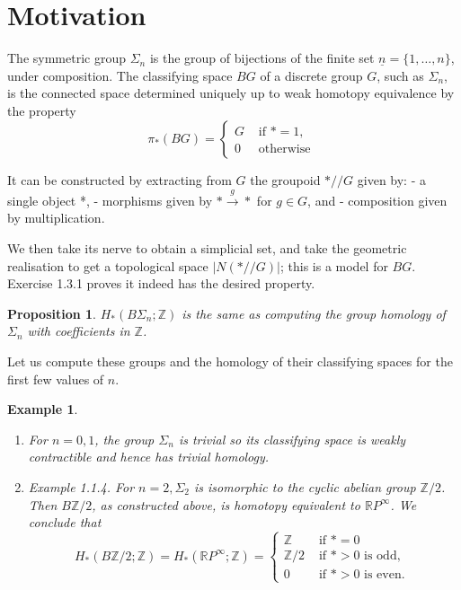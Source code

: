 \documentclass{book}
\newtheorem{prop}{Proposition}
\newtheorem{example}{Example}
\begin{document}
\section{Motivation}

The symmetric group $\Sigma_n$ is the group of bijections of the finite set $\underline{n}=\{1, \ldots, n\}$, under composition. The classifying space $B G$ of a discrete group $G$, such as $\Sigma_n$, is the connected space determined uniquely up to weak homotopy equivalence by the property
$$
\pi_*(B G)= \begin{cases}G & \text { if } *=1, \\ 0 & \text { otherwise }\end{cases}
$$

It can be constructed by extracting from $G$ the groupoid $* / / G$ given by:
- a single object *,
- morphisms given by $* \xrightarrow{g} *$ for $g \in G$, and
- composition given by multiplication.

We then take its nerve to obtain a simplicial set, and take the geometric realisation to get a topological space $|N(* / / G)|$; this is a model for $B G$. Exercise 1.3.1 proves it indeed has the desired property.


\begin{prop}
    $H_*\left(B \Sigma_n ; \mathbb{Z}\right)$  is the same as computing the group homology of $\Sigma_n$ with coefficients in $\mathbb{Z}$.
\end{prop}
Let us compute these groups and the homology of their classifying spaces for the first few values of $n$.

\begin{example}
    \begin{enumerate}
        \item For $n=0,1$, the group $\Sigma_n$ is trivial so its classifying space is weakly contractible and hence has trivial homology.
        \item Example 1.1.4. For $n=2, \Sigma_2$ is isomorphic to the cyclic abelian group $\mathbb{Z} / 2$. Then $B \mathbb{Z} / 2$, as constructed above, is homotopy equivalent to $\mathbb{R} P^{\infty}$. We conclude that
        $$
        H_*(B \mathbb{Z} / 2 ; \mathbb{Z})=H_*\left(\mathbb{R} P^{\infty} ; \mathbb{Z}\right)= \begin{cases}\mathbb{Z} & \text { if } *=0 \\ \mathbb{Z} / 2 & \text { if } *>0 \text { is odd, } \\ 0 & \text { if } *>0 \text { is even. }\end{cases}
        $$
        
    \end{enumerate}
\end{example}








\printbibliography %
\end{document}
